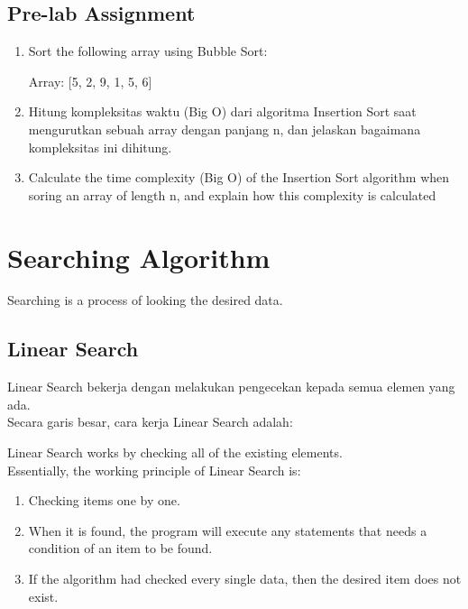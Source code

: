 \subsection{Pre-lab Assignment}
\begin{enumerate}

    \item Sort the following array using Bubble Sort:

    Array: [5, 2, 9, 1, 5, 6]
    \item Hitung kompleksitas waktu (Big O) dari algoritma Insertion Sort saat mengurutkan sebuah array dengan panjang n, 
    dan jelaskan bagaimana kompleksitas ini dihitung.
    \item Calculate the time complexity (Big O) of the Insertion Sort algorithm when soring an array of length n, and 
    explain how this complexity is calculated
\end{enumerate}

\section{Searching Algorithm}
Searching is a process of looking the desired data.

\subsection{Linear Search}
Linear Search bekerja dengan melakukan pengecekan kepada semua elemen yang ada.\\
Secara garis besar, cara kerja Linear Search adalah:

Linear Search works by checking all of the existing elements.\\
Essentially, the working principle of Linear Search is:

\begin{enumerate}
    \item Checking items one by one.
    \item When it is found, the program will execute any statements that needs a condition of an item to be found.
    \item If the algorithm had checked every single data, then the desired item does not exist.
\end{enumerate}

